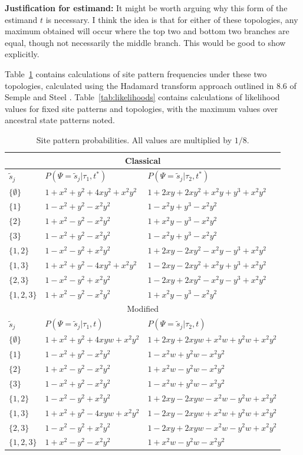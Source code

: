 \documentclass[a4paper]{article}
\newcommand{\siteSplit}{\tilde{s}}
\newcommand{\siteSplitRV}{\Psi}
\begin{document}
\textbf{Justification for estimand:} It might be worth arguing why this form of the estimand $t$ is necessary.
I think the idea is that for either of these topologies, any maximum obtained will occur where the top two and bottom two branches are equal, though not necessarily the middle branch.
This would be good to show explicitly.

Table~\ref{tab:sitepatprob} contains calculations of site pattern frequencies under these two topologies, calculated using the Hadamard transform approach outlined in 8.6 of Semple and Steel \cite{Semple2003-em}.
Table~\ref{tab:likelihoods} contains calculations of likelihood values for fixed site patterns and topologies, with the maximum values over ancestral state patterns noted.

\begin{table}
\centering
\begin{tabular}{|l|l|l|}
\multicolumn{3}{c}{Classical}\\
    \hline
$\siteSplit_j$   &$P(\siteSplitRV=\siteSplit_j|\tau_1,t^*)$&$P(\siteSplitRV=\siteSplit_j|\tau_2,t^*)$\\
    \hline
    $\{\emptyset\}$&$1+x^2+y^2+4xy^2+x^2y^2$&$1+2xy+2xy^2+x^2y+y^3+x^2y^2$\\
    $\{1\}$        &$1-x^2+y^2-x^2y^2$&$1-x^2y+y^3-x^2y^2$\\
    $\{2\}$        &$1+x^2-y^2-x^2y^2$&$1+x^2y-y^3-x^2y^2$\\
    $\{3\}$        &$1-x^2+y^2-x^2y^2$&$1-x^2y+y^3-x^2y^2$\\
    $\{1,2\}$      &$1-x^2-y^2+x^2y^2$&$1+2xy-2xy^2-x^2y-y^3+x^2y^2$\\
    $\{1,3\}$      &$1+x^2+y^2-4xy^2+x^2y^2$&$1-2xy-2xy^2+x^2y+y^3+x^2y^2$\\
    $\{2,3\}$      &$1-x^2-y^2+x^2y^2$&$1-2xy+2xy^2-x^2y-y^3+x^2y^2$\\
    $\{1,2,3\}$    &$1+x^2-y^2-x^2y^2$&$1+x^2y-y^3-x^2y^2$\\
    \hline
\multicolumn{3}{c}{Modified}\\
    \hline
$\siteSplit_j$   &$P(\siteSplitRV=\siteSplit_j|\tau_1,t)$&$P(\siteSplitRV=\siteSplit_j|\tau_2,t)$\\
    \hline
    $\{\emptyset\}$&$1+x^2+y^2+4xyw+x^2y^2$&$1+2xy+2xyw+x^2w+y^2w+x^2y^2$\\
    $\{1\}$        &$1-x^2+y^2-x^2y^2$&$1-x^2w+y^2w-x^2y^2$\\
    $\{2\}$        &$1+x^2-y^2-x^2y^2$&$1+x^2w-y^2w-x^2y^2$\\
    $\{3\}$        &$1-x^2+y^2-x^2y^2$&$1-x^2w+y^2w-x^2y^2$\\
    $\{1,2\}$      &$1-x^2-y^2+x^2y^2$&$1+2xy-2xyw-x^2w-y^2w+x^2y^2$\\
    $\{1,3\}$      &$1+x^2+y^2-4xyw+x^2y^2$&$1-2xy-2xyw+x^2w+y^2w+x^2y^2$\\
    $\{2,3\}$      &$1-x^2-y^2+x^2y^2$&$1-2xy+2xyw-x^2w-y^2w+x^2y^2$\\
    $\{1,2,3\}$    &$1+x^2-y^2-x^2y^2$&$1+x^2w-y^2w-x^2y^2$\\
    \hline
\end{tabular}
\caption{Site pattern probabilities.
All values are multiplied by $1/8$.}
\label{tab:sitepatprob}
\end{table}
\end{document}
